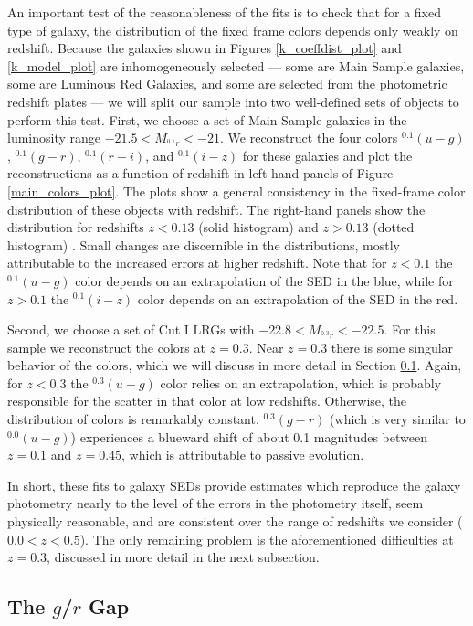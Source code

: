 \documentclass[10pt,preprint]{aastex}
\newcommand{\band}[2]{\ensuremath{^{#1}{#2}}}
\begin{document}
An important test of the reasonableness of the fits is to check that
for a fixed type of galaxy, the distribution of the fixed frame colors
depends only weakly on redshift. Because the galaxies shown in Figures
\ref{k_coeffdist_plot} and \ref{k_model_plot} are inhomogeneously
selected --- some are Main Sample galaxies, some are Luminous Red
Galaxies, and some are selected from the photometric redshift plates
--- we will split our sample into two well-defined sets of objects to
perform this test. First, we choose a set of Main Sample galaxies in
the luminosity range $-21.5 < M_{\band{0.1}{r}} < -21$. We reconstruct
the four colors $^{0.1}(u-g)$, $^{0.1}(g-r)$, $^{0.1}(r-i)$, and
$^{0.1}(i-z)$ for these galaxies and plot the reconstructions as a
function of redshift in left-hand panels of Figure
\ref{main_colors_plot}. The plots show a general consistency in the
fixed-frame color distribution of these objects with redshift. The
right-hand panels show the distribution for redshifts $z<0.13$ (solid
histogram) and $z>0.13$ (dotted histogram) . Small changes are
discernible in the distributions, mostly attributable to the increased
errors at higher redshift. Note that for $z<0.1$ the $^{0.1}(u-g)$
color depends on an extrapolation of the SED in the blue, while for
$z>0.1$ the $^{0.1}(i-z)$ color depends on an extrapolation of the SED
in the red.

Second, we choose a set of Cut I LRGs with $-22.8 < M_{\band{0.3}{r}}
< -22.5$. For this sample we reconstruct the colors at $z=0.3$.  Near
$z=0.3$ there is some singular behavior of the colors, which we will
discuss in more detail in Section \ref{grgap}. Again, for $z<0.3$ the
$^{0.3}(u-g)$ color relies on an extrapolation, which is probably
responsible for the scatter in that color at low redshifts. Otherwise,
the distribution of colors is remarkably constant. $^{0.3}(g-r)$
(which is very similar to $^{0.0}(u-g)$) experiences a blueward shift
of about 0.1 magnitudes between $z=0.1$ and $z=0.45$, which is
attributable to passive evolution.

In short, these fits to galaxy SEDs provide estimates which reproduce
the galaxy photometry nearly to the level of the errors in the
photometry itself, seem physically reasonable, and are consistent over
the range of redshifts we consider ($0.0 < z < 0.5$). The only
remaining problem is the aforementioned difficulties at $z=0.3$,
discussed in more detail in the next subsection.

\subsection{The $g$/$r$ Gap}
\label{grgap}
\end{document}
